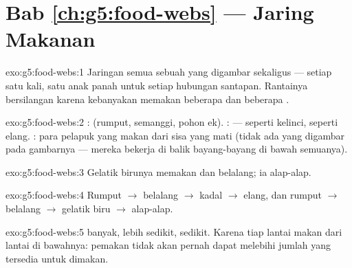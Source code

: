 \section*{Bab \ref{ch:g5:food-webs} --- Jaring Makanan}

\begin{solution}{exo:g5:food-webs:1}
Jaringan semua  sebuah  yang digambar sekaligus
--- setiap  satu kali, satu anak panah untuk setiap hubungan
santapan. Rantainya bersilangan karena kebanyakan  memakan
beberapa  dan  beberapa .
\end{solution}

\begin{solution}{exo:g5:food-webs:2}
:  (rumput, semanggi,  pohon ek). : 
---  seperti kelinci,  seperti elang. : para
pelapuk yang makan dari sisa yang mati (tidak ada yang digambar pada
gambarnya --- mereka bekerja di balik bayang-bayang di bawah semuanya).
\end{solution}

\begin{solution}{exo:g5:food-webs:3}
Gelatik birunya memakan  dan belalang; ia  alap-alap.
\end{solution}

\begin{solution}{exo:g5:food-webs:4}
Rumput $\rightarrow$ belalang $\rightarrow$ kadal
$\rightarrow$ elang, dan rumput $\rightarrow$ belalang
$\rightarrow$ gelatik biru $\rightarrow$ alap-alap.
\end{solution}

\begin{solution}{exo:g5:food-webs:5}
 banyak,  lebih sedikit,  sedikit. Karena
tiap lantai makan dari lantai di bawahnya: pemakan tidak akan pernah
dapat melebihi jumlah yang tersedia untuk dimakan.
\end{solution}

